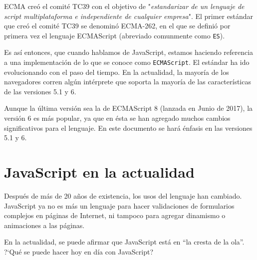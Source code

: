 ECMA creó el comité TC39 con el objetivo de "\emph{estandarizar de un lenguaje de script multiplataforma e independiente de cualquier empresa}". El primer estándar que creó el comité TC39 se denominó ECMA-262, en el que se definió por primera vez el lenguaje ECMAScript (abreviado comunmente como \texttt{ES}).

Es así entonces, que cuando hablamos de JavaScript, estamos haciendo referencia a una implementación de lo que se conoce como \texttt{ECMAScript}. El estándar ha ido evolucionando con el paso del tiempo. En la actualidad, la mayoría de los navegadores corren algún intérprete que soporta la mayoría de las características de las versiones 5.1 y 6. 

Aunque la última versión sea la de ECMAScript 8 (lanzada en Junio de 2017), la versión 6 es más popular, ya que en ésta se han agregado muchos cambios significativos para el lenguaje. En este documento se hará énfasis en las versiones 5.1 y 6.


\section{JavaScript en la actualidad}

Después de más de 20 años de existencia, los usos del lenguaje han cambiado. JavaScript ya no es más un lenguaje para hacer validaciones de formularios complejos en páginas de Internet, ni tampoco para agregar dinamismo o animaciones a las páginas.

En la actualidad, se puede afirmar que JavaScript está en "`la cresta de la ola"'. ?`Qué se puede hacer hoy en día con JavaScript?

